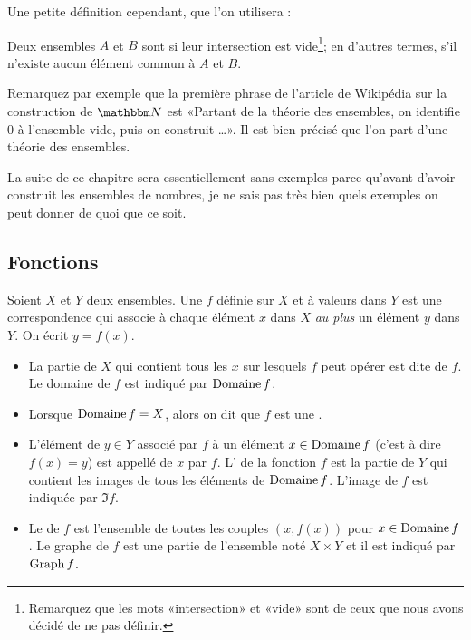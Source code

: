Une petite définition cependant, que l'on utilisera :
\begin{definition}\label{DefEnsemblesDisjoints}
    Deux ensembles $A$ et $B$ sont  si leur intersection est vide\footnote{Remarquez que les mots «intersection» et «vide» sont de ceux que nous avons décidé de ne pas définir.}; en d'autres termes, s'il n'existe aucun élément commun à $A$ et $B$.
\end{definition}

\begin{normaltext}
    Remarquez par exemple que la première phrase de l'article de Wikipédia sur la construction de \( \eN\) est «Partant de la théorie des ensembles, on identifie 0 à l'ensemble vide, puis on construit \ldots». Il est bien précisé que l'on part d'une théorie des ensembles.
\end{normaltext}

\begin{normaltext}
    La suite de ce chapitre sera essentiellement sans exemples parce qu'avant d'avoir construit les ensembles de nombres, je ne sais pas très bien quels exemples on peut donner de quoi que ce soit.
\end{normaltext}

\subsection{Fonctions}

\begin{definition}
  Soient $X$ et $Y$ deux ensembles. Une  $f$ définie sur $X$ et à valeurs dans $Y$ est une correspondence qui associe à chaque élément $x$ dans $X$ \emph{au plus} un élément $y$ dans $Y$. On écrit $y= f(x)$.
  \begin{itemize}
  \item La partie de $X$ qui contient tous les $x$ sur lesquels $f$ peut opérer est dite  de $f$. Le domaine de $f$ est indiqué par $\operatorname{Domaine} f$.
  \item Lorsque \( \operatorname{Domaine} f = X \), alors on dit que \( f \) est une .
  \item L'élément de $y\in Y$ associé par $f$ à un élément $x\in \operatorname{Domaine} f$ (c'est à dire $f(x) = y$)  est appellé  de $x$ par $f$. L' de la fonction $f$ est la partie de $Y$ qui contient les images de tous les éléments de $\operatorname{Domaine} f$. L'image de $f$ est indiquée par $\Im f$.
  \item Le  de $f$ est l'ensemble de toutes les couples $(x, f(x))$ pour $x\in \operatorname{Domaine} f$. Le graphe de $f$ est une partie de l'ensemble noté $X\times Y$ et il est indiqué par $\operatorname{Graph} f$.
  \end{itemize}
\end{definition}

